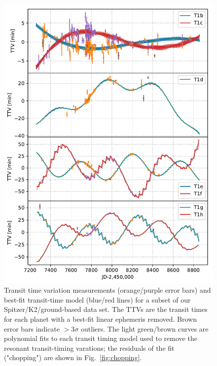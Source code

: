 \documentclass[twocolumn]{aastex63}
\begin{document}
\begin{figure}
	\includegraphics[width=0.95\hsize]{figures/T1_ttvs_4panel_stacked.pdf}
    \caption{Transit time variation measurements (orange/purple error bars) and best-fit
    transit-time model (blue/red lines) for a subset of our
    Spitzer/K2/ground-based data set.  The TTVs are the transit times for each planet 
    with a best-fit linear ephemeris removed.  Brown error bars indicate $>3\sigma$ outliers.  The light green/brown curves are polynomial fits
    to each transit timing model used to remove the resonant transit-timing varations;  the residuals
    of the fit ("chopping") are shown in Fig.\ \ref{fig:chopping}.}
    \label{fig:T1_TTVs}
\end{figure}
\end{document}
